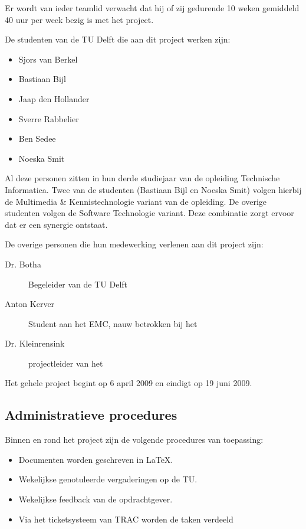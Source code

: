 Er wordt van ieder teamlid verwacht dat hij of zij gedurende 10 weken gemiddeld 40 uur per week bezig is met het project.

De studenten van de TU Delft die aan dit project werken zijn:
\begin{itemize}
	\item Sjors van Berkel 
	\item Bastiaan Bijl
	\item Jaap den Hollander
	\item Sverre Rabbelier
	\item Ben Sedee
	\item Noeska Smit
\end{itemize}
Al deze personen zitten in hun derde studiejaar van de opleiding Technische Informatica. Twee van de studenten (Bastiaan Bijl en Noeska Smit) volgen hierbij de Multimedia \& Kennistechnologie variant van de opleiding. De overige studenten volgen de Software Technologie variant. Deze combinatie zorgt ervoor dat er een synergie ontstaat.


De overige personen die hun medewerking verlenen aan dit project zijn:
\begin{description}
	\item[Dr. Botha] Begeleider van de TU Delft
	\item[Anton Kerver] Student aan het EMC, nauw betrokken bij het \casamproject
	\item[Dr. Kleinrensink] projectleider van het \casamproject
\end{description}
Het gehele project begint op 6 april 2009 en eindigt op 19 juni 2009.

\subsection{Administratieve procedures}

Binnen en rond het project zijn de volgende procedures van toepassing:

\begin{itemize}
    \item Documenten worden geschreven in \LaTeX.
    \item Wekelijkse genotuleerde vergaderingen op de TU.
    \item Wekelijkse feedback van de opdrachtgever.
    \item Via het ticketsysteem van TRAC\cite{trac} worden de taken verdeeld
\end{itemize}

